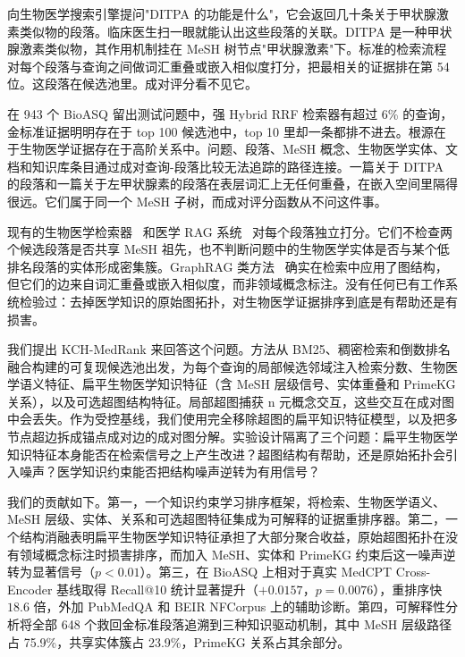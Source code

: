 向生物医学搜索引擎提问"DITPA 的功能是什么"，它会返回几十条关于甲状腺激素类似物的段落。临床医生扫一眼就能认出这些段落的关联。DITPA 是一种甲状腺激素类似物，其作用机制挂在 MeSH 树节点"甲状腺激素"下。标准的检索流程对每个段落与查询之间做词汇重叠或嵌入相似度打分，把最相关的证据排在第 54 位。这段落在候选池里。成对评分看不见它。

在 943 个 BioASQ 留出测试问题中，强 Hybrid RRF 检索器有超过 6\% 的查询，金标准证据明明存在于 top 100 候选池中，top 10 里却一条都排不进去。根源在于生物医学证据存在于高阶关系中。问题、段落、MeSH 概念、生物医学实体、文档和知识库条目通过成对查询-段落比较无法追踪的路径连接。一篇关于 DITPA 的段落和一篇关于左甲状腺素的段落在表层词汇上无任何重叠，在嵌入空间里隔得很远。它们属于同一个 MeSH 子树，而成对评分函数从不问这件事。

现有的生物医学检索器~\citep{jin2023medcpt} 和医学 RAG 系统~\citep{xiong2024benchmarking,xiong2024imedrag} 对每个段落独立打分。它们不检查两个候选段落是否共享 MeSH 祖先，也不判断问题中的生物医学实体是否与某个低排名段落的实体形成密集簇。GraphRAG 类方法~\citep{edge2024graphrag,wu2024medgraphrag,luo2025hypergraphrag} 确实在检索中应用了图结构，但它们的边来自词汇重叠或嵌入相似度，而非领域概念标注。没有任何已有工作系统检验过：去掉医学知识的原始图拓扑，对生物医学证据排序到底是有帮助还是有损害。

我们提出 KCH-MedRank 来回答这个问题。方法从 BM25、稠密检索和倒数排名融合构建的可复现候选池出发，为每个查询的局部候选邻域注入检索分数、生物医学语义特征、扁平生物医学知识特征（含 MeSH 层级信号、实体重叠和 PrimeKG 关系），以及可选超图结构特征。局部超图捕获 n 元概念交互，这些交互在成对图中会丢失。作为受控基线，我们使用完全移除超图的扁平知识特征模型，以及把多节点超边拆成锚点成对边的成对图分解。实验设计隔离了三个问题：扁平生物医学知识特征本身能否在检索信号之上产生改进？超图结构有帮助，还是原始拓扑会引入噪声？医学知识约束能否把结构噪声逆转为有用信号？

我们的贡献如下。第一，一个知识约束学习排序框架，将检索、生物医学语义、MeSH 层级、实体、关系和可选超图特征集成为可解释的证据重排序器。第二，一个结构消融表明扁平生物医学知识特征承担了大部分聚合收益，原始超图拓扑在没有领域概念标注时损害排序，而加入 MeSH、实体和 PrimeKG 约束后这一噪声逆转为显著信号（$p < 0.01$）。第三，在 BioASQ 上相对于真实 MedCPT Cross-Encoder 基线取得 Recall@10 统计显著提升（$+0.0157$，$p=0.0076$），重排序快 $18.6$ 倍，外加 PubMedQA 和 BEIR NFCorpus 上的辅助诊断。第四，可解释性分析将全部 648 个救回金标准段落追溯到三种知识驱动机制，其中 MeSH 层级路径占 75.9\%，共享实体簇占 23.9\%，PrimeKG 关系占其余部分。
